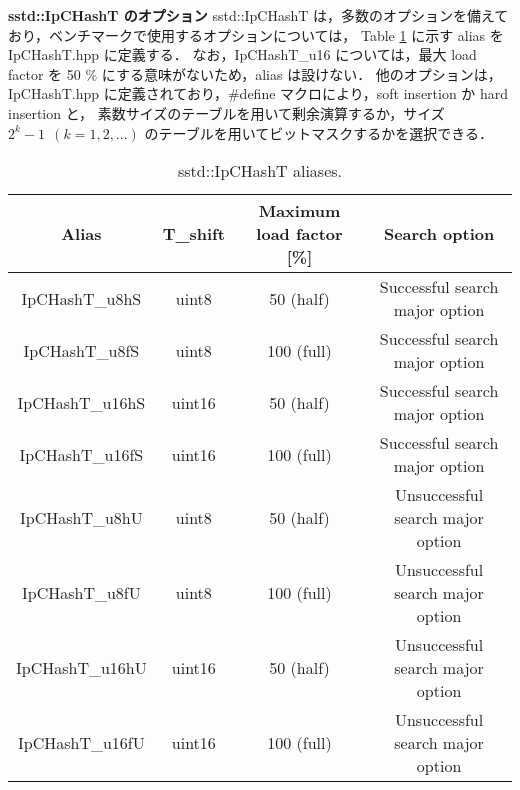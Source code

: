 {\bf sstd::IpCHashT のオプション}
\samepage\newline\indent
sstd::IpCHashT は，多数のオプションを備えており，ベンチマークで使用するオプションについては，
Table \ref{table_alias} に示す alias を IpCHashT.hpp に定義する．
なお，IpCHashT\_u16 については，最大 load factor を 50 \% にする意味がないため，alias は設けない．
他のオプションは，IpCHashT.hpp に定義されており，\#define マクロにより，soft insertion か hard insertion と，
素数サイズのテーブルを用いて剰余演算するか，サイズ $2^k-1\ \ (k=1,2,...)$ のテーブルを用いてビットマスクするかを選択できる．

\begin{table}[h]
  \begin{center}
    \fontsize{9pt}{10pt}\selectfont
    \caption{sstd::IpCHashT aliases.}
    \begin{tabular}{c|ccc} \hline
      Alias           & T\_shift & Maximum load factor [\%] \rule[0pt]{0pt}{10pt} & Search option \\ \hline
      IpCHashT\_u8hS  & uint8    &  50 (half)                                     &   Successful search major option \rule[0pt]{0pt}{10pt} \\
      IpCHashT\_u8fS  & uint8    & 100 (full)                                     &   Successful search major option \rule[0pt]{0pt}{10pt} \\
      IpCHashT\_u16hS & uint16   &  50 (half)                                     &   Successful search major option \rule[0pt]{0pt}{10pt} \\
      IpCHashT\_u16fS & uint16   & 100 (full)                                     &   Successful search major option \rule[0pt]{0pt}{10pt} \\
      IpCHashT\_u8hU  & uint8    &  50 (half)                                     & Unsuccessful search major option \rule[0pt]{0pt}{10pt} \\
      IpCHashT\_u8fU  & uint8    & 100 (full)                                     & Unsuccessful search major option \rule[0pt]{0pt}{10pt} \\
      IpCHashT\_u16hU & uint16   &  50 (half)                                     & Unsuccessful search major option \rule[0pt]{0pt}{10pt} \\
      IpCHashT\_u16fU & uint16   & 100 (full)                                     & Unsuccessful search major option \rule[0pt]{0pt}{10pt} \\ \hline
    \end{tabular}
    \label{table_alias}
  \end{center}
\end{table}

